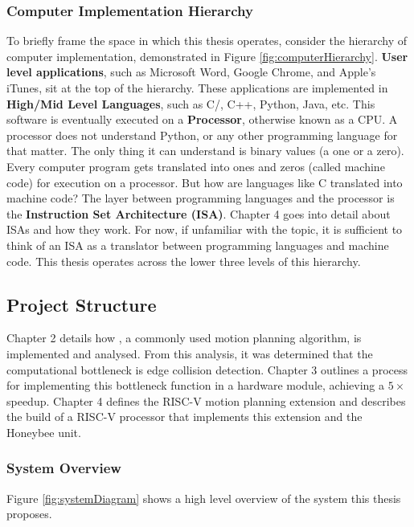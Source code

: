     \newpage
    \subsubsection{Computer Implementation Hierarchy}
        To briefly frame the space in which this thesis operates, consider the hierarchy of computer implementation, demonstrated in Figure \ref{fig:computerHierarchy}. \textbf{User level applications}, such as Microsoft Word, Google Chrome, and Apple's iTunes, sit at the top of the hierarchy. These applications are implemented in \textbf{High/Mid Level Languages}, such as C/, C++, Python, Java, etc. 
        This software is eventually executed on a \textbf{Processor}, otherwise known as a \gls{CPU}. A processor does not understand Python, or any other programming language for that matter. The only thing it can understand is binary values (a one or a zero). Every computer program gets translated into ones and zeros (called machine code) for execution on a processor. But how are languages like C translated into machine code? The layer between programming languages and the processor is the \textbf{Instruction Set Architecture (ISA)}. Chapter 4 goes into detail about \gls{ISA}s and how they work. For now, if unfamiliar with the topic, it is sufficient to think of an \gls{ISA} as a translator between programming languages and machine code. This thesis operates across the lower three levels of this hierarchy.
        
        



\subsection{Project Structure}
\label{subsection:project_structure}

    Chapter 2 details how , a commonly used motion planning algorithm, is implemented and analysed. From this analysis, it was determined that the computational bottleneck is edge collision detection. Chapter 3 outlines a process for implementing this bottleneck function in a hardware module, achieving a $5 \times$ speedup. Chapter 4 defines the RISC-V motion planning extension and describes the build of a RISC-V processor that implements this extension and the Honeybee unit.


    \subsubsection{System Overview}
        Figure \ref{fig:systemDiagram} shows a high level overview of the system this thesis proposes.
        

